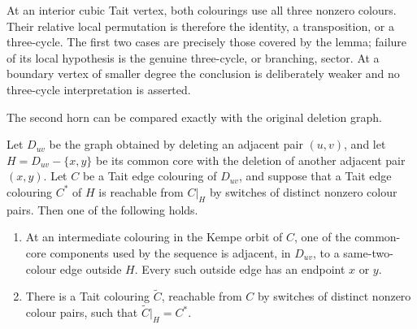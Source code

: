 At an interior cubic Tait vertex, both colourings use all three nonzero
colours.  Their relative local permutation is therefore the identity, a
transposition, or a three-cycle.  The first two cases are precisely those
covered by the lemma; failure of its local hypothesis is the genuine
three-cycle, or branching, sector.  At a boundary vertex of smaller degree
the conclusion is deliberately weaker and no three-cycle interpretation is
asserted.

The second horn can be compared exactly with the original deletion graph.

\begin{lemma}
\label{lem:common-core-kempe-lift-or-boundary}
Let \(D_{uv}\) be the graph obtained by deleting an adjacent pair
\((u,v)\), and let \(H=D_{uv}-\{x,y\}\) be its common core with the deletion
of another adjacent pair \((x,y)\).  Let \(C\) be a Tait edge colouring of
\(D_{uv}\), and suppose that a Tait edge colouring \(C^*\) of \(H\) is
reachable from \(C|_H\) by switches of distinct nonzero colour pairs.  Then
one of the following holds.
\begin{enumerate}
\item At an intermediate colouring in the Kempe orbit of \(C\), one of the
      common-core components used by the sequence is adjacent, in
      \(D_{uv}\), to a same-two-colour edge outside \(H\).  Every such
      outside edge has an endpoint \(x\) or \(y\).
\item There is a Tait colouring \(\widetilde C\), reachable from \(C\) by
      switches of distinct nonzero colour pairs, such that
      \(\widetilde C|_H=C^*\).
\end{enumerate}
\end{lemma}


